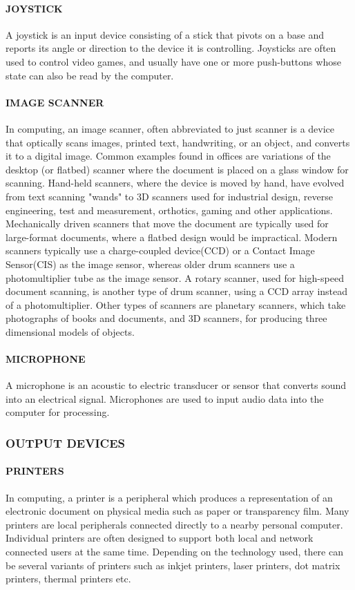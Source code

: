 \documentclass[a4paper,28pt,twoside,openright]{report}
\begin{document}
	\paragraph{JOYSTICK}
	 A joystick is an input device consisting of a stick that pivots on a base and reports its angle or
	direction to the device it is controlling. Joysticks are often used to control video games, and usually
	have one or more push-buttons whose state can also be read by the computer.
	\paragraph{IMAGE SCANNER}
	 In computing, an image scanner, often abbreviated to just scanner is a device that
	optically scans images, printed text, handwriting, or an object, and converts it to a digital image.
	Common examples found in offices are variations of the desktop (or flatbed) scanner where the
	document is placed on a glass window for scanning. Hand-held scanners, where the device is moved by
		hand, have evolved from text scanning "wands" to 3D scanners used for industrial design, reverse
	engineering, test and measurement, orthotics, gaming and other applications. Mechanically driven
	scanners that move the document are typically used for large-format documents, where a flatbed design
	would be impractical. Modern scanners typically use a charge-coupled device(CCD) or a Contact
	Image Sensor(CIS) as the image sensor, whereas older drum scanners use a photomultiplier tube as the
	image sensor. A rotary scanner, used for high-speed document scanning, is another type of drum
	scanner, using a CCD array instead of a photomultiplier. Other types of scanners are planetary
	scanners, which take photographs of books and documents, and 3D scanners, for producing three dimensional
	models of objects.
	\paragraph{MICROPHONE} 
	A microphone is an acoustic to electric transducer or sensor that converts sound into an
	electrical signal. Microphones are used to input audio data into the computer for processing.
\subsubsection*{OUTPUT DEVICES}
		\paragraph{PRINTERS}
	 In computing, a printer is a peripheral which produces a representation of an electronic
	document on physical media such as paper or transparency film. Many printers are local peripherals
	connected directly to a nearby personal computer. Individual printers are often designed to support both
	local and network connected users at the same time. Depending on the technology used, there can be
	several variants of printers such as inkjet printers, laser printers, dot matrix printers, thermal printers
	etc.
\end{document}

